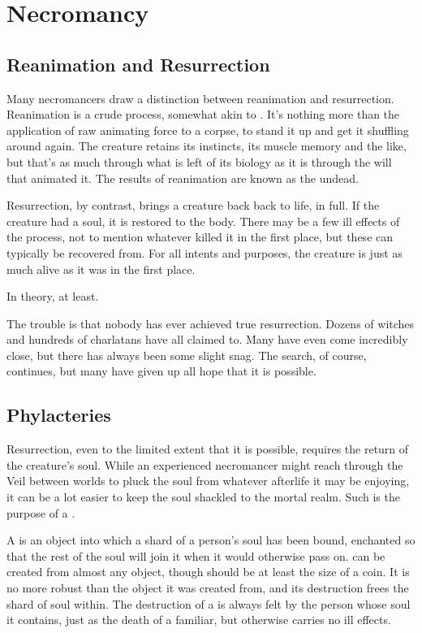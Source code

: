 \chapter{Necromancy}

\section{Reanimation and Resurrection}

Many necromancers draw a distinction between reanimation and resurrection.
Reanimation is a crude process, somewhat akin to .
It's nothing more than the application of raw animating force to a corpse, to stand it up and get it shuffling around again.
The creature retains its instincts, its muscle memory and the like, but that's as much through what is left of its biology as it is through the will that animated it.
The results of reanimation are known as the undead.

Resurrection, by contrast, brings a creature back back to life, in full.
If the creature had a soul, it is restored to the body.
There may be a few ill effects of the process, not to mention whatever killed it in the first place, but these can typically be recovered from.
For all intents and purposes, the creature is just as much alive as it was in the first place.

In theory, at least.

The trouble is that nobody has ever achieved true resurrection.
Dozens of witches and hundreds of charlatans have all claimed to.
Many have even come incredibly close, but there has always been some slight snag.
The search, of course, continues, but many have given up all hope that it is possible.

\section{Phylacteries}

Resurrection, even to the limited extent that it is possible, requires the return of the creature's soul.
While an experienced necromancer might reach through the Veil between worlds to pluck the soul from whatever afterlife it may be enjoying, it can be a lot easier to keep the soul shackled to the mortal realm.
Such is the purpose of a {\phylactery}.

A {\phylactery} is an object into which a shard of a person's soul has been bound, enchanted so that the rest of the soul will join it when it would otherwise pass on.
{\phylacteries} can be created from almost any object, though should be at least the size of a coin.
It is no more robust than the object it was created from, and its destruction frees the shard of soul within.
The destruction of a {\phylactery} is always felt by the person whose soul it contains, just as the death of a familiar, but otherwise carries no ill effects.

